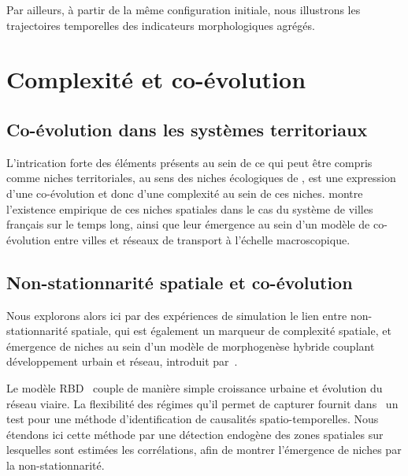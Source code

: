 \documentclass[11pt]{article}
\begin{document}
Par ailleurs, à partir de la même configuration initiale, nous illustrons les trajectoires temporelles des indicateurs morphologiques agrégés.




\section{Complexité et co-évolution}


\subsection{Co-évolution dans les systèmes territoriaux}

L'intrication forte des éléments présents au sein de ce qui peut être compris comme niches territoriales, au sens des niches écologiques de \cite{holland2012signals}, est une expression d'une co-évolution et donc d'une complexité au sein de ces niches. \cite{raimbault2018modeling} montre l'existence empirique de ces niches spatiales dans le cas du système de villes français sur le temps long, ainsi que leur émergence au sein d'un modèle de co-évolution entre villes et réseaux de transport à l'échelle macroscopique.


\subsection{Non-stationnarité spatiale et co-évolution}

Nous explorons alors ici par des expériences de simulation le lien entre non-stationnarité spatiale, qui est également un marqueur de complexité spatiale, et émergence de niches au sein d'un modèle de morphogenèse hybride couplant développement urbain et réseau, introduit par~\cite{raimbault2014hybrid}.

Le modèle RBD~\citep{raimbault2014hybrid} couple de manière simple croissance urbaine et évolution du réseau viaire. La flexibilité des régimes qu'il permet de capturer fournit dans~\cite{raimbault2017identification} un test pour une méthode d'identification de causalités spatio-temporelles. Nous étendons ici cette méthode par une détection endogène des zones spatiales sur lesquelles sont estimées les corrélations, afin de montrer l'émergence de niches par la non-stationnarité.


\end{document}
